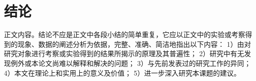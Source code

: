 \documentclass[a4paper, zihao=5, UTF8, AutoFakeBold, AutoFakeSlant]{ctexart}
\numberwithin{equation}{section}
\numberwithin{figure}{section}
\numberwithin{table}{section}
\begin{document}
\section{结论}
正文内容。结论不应是正文中各段小结的简单重复，它应以正文中的实验或考察得到的现象、数据的阐述分析为依据，完整、准确、简洁地指出以下内容：
1）由对研究对象进行考察或实验得到的结果所揭示的原理及其普遍性；
2）研究中有无发现例外或本论文尚难以解释和解决的问题；
3）与先前发表过的研究工作的异同；
4）本文在理论上和实用上的意义及价值；
5）进一步深入研究本课题的建议。


\balance  %
\vspace{-6pt}
\printbibliography
[
	heading=bibliography,
	title={参考文献}
]
\end{document}
